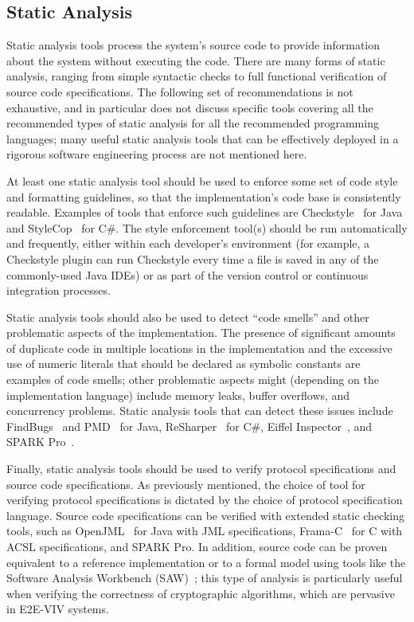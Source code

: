 \subsection{Static Analysis}

Static analysis tools process the system's source code to provide
information about the system without executing the code.  There are
many forms of static analysis, ranging from simple syntactic checks to
full functional verification of source code specifications. The
following set of recommendations is not exhaustive, and in particular
does not discuss specific tools covering all the recommended types of
static analysis for all the recommended programming languages; many
useful static analysis tools that can be effectively deployed in a
rigorous software engineering process are not mentioned here.

At least one static analysis tool should be used to enforce some set
of code style and formatting guidelines, so that the implementation's
code base is consistently readable. Examples of tools that enforce
such guidelines are Checkstyle~\cite{Checkstyle} for Java and
StyleCop~\cite{StyleCop} for C\#. The style enforcement tool(s) should
be run automatically and frequently, either within each developer's
environment (for example, a Checkstyle plugin can run Checkstyle every
time a file is saved in any of the commonly-used Java IDEs) or as part
of the version control or continuous integration processes.

Static analysis tools should also be used to detect ``code smells''
and other problematic aspects of the implementation. The presence of
significant amounts of duplicate code in multiple locations in the
implementation and the excessive use of numeric literals that should
be declared as symbolic constants are examples of code smells; other
problematic aspects might (depending on the implementation language)
include memory leaks, buffer overflows, and concurrency problems.
Static analysis tools that can detect these issues include
FindBugs~\cite{FindBugs} and PMD~\cite{PMD} for Java,
ReSharper~\cite{ReSharper} for C\#, Eiffel
Inspector~\cite{EiffelInspector}, and SPARK Pro~\cite{SPARKPro}.

Finally, static analysis tools should be used to verify protocol
specifications and source code specifications. As previously
mentioned, the choice of tool for verifying protocol specifications is
dictated by the choice of protocol specification language. Source code
specifications can be verified with extended static checking tools,
such as OpenJML~\cite{OpenJML} for Java with JML specifications,
Frama-C~\cite{Frama-C} for C with ACSL specifications, and SPARK
Pro. In addition, source code can be proven equivalent to a reference
implementation or to a formal model using tools like the Software
Analysis Workbench (SAW)~\cite{SAW}; this type of analysis is
particularly useful when verifying the correctness of cryptographic
algorithms, which are pervasive in E2E-VIV systems.


